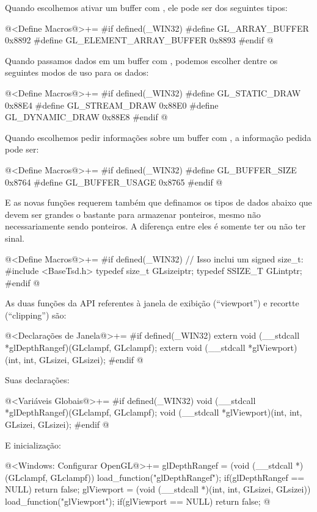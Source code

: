 Quando escolhemos ativar um buffer com , ele
pode ser dos seguintes tipos:

\iniciocodigo
@<Define Macros@>+=
#if defined(_WIN32)
#define GL_ARRAY_BUFFER         0x8892
#define GL_ELEMENT_ARRAY_BUFFER 0x8893
#endif
@
\fimcodigo

Quando passamos dados em um buffer com ,
podemos escolher dentre os seguintes modos de uso para os dados:

\iniciocodigo
@<Define Macros@>+=
#if defined(_WIN32)
#define GL_STATIC_DRAW  0x88E4
#define GL_STREAM_DRAW  0x88E0
#define GL_DYNAMIC_DRAW 0x88E8
#endif
@
\fimcodigo

Quando escolhemos pedir informações sobre um buffer
com , a informação pedida pode ser:

\iniciocodigo
@<Define Macros@>+=
#if defined(_WIN32)
#define GL_BUFFER_SIZE  0x8764
#define GL_BUFFER_USAGE 0x8765
#endif
@
\fimcodigo

E as novas funções requerem também que definamos os tipos de dados
abaixo que devem ser grandes o bastante para armazenar ponteiros,
mesmo não necessariamente sendo ponteiros. A diferença entre eles é
somente ter ou não ter sinal.

\iniciocodigo
@<Define Macros@>+=
#if defined(_WIN32)
// Isso inclui um signed size_t:
#include <BaseTsd.h>
typedef size_t GLsizeiptr;
typedef SSIZE_T GLintptr;
#endif
@
\fimcodigo

As duas funções da API referentes à janela de exibição (``viewport'')
e recortte (``clipping'') são:

\iniciocodigo
@<Declarações de Janela@>+=
#if defined(_WIN32)
extern void (__stdcall *glDepthRangef)(GLclampf, GLclampf);
extern void (__stdcall *glViewport)(int, int, GLsizei, GLsizei);
#endif
@
\fimcodigo

Suas declarações:

\iniciocodigo
@<Variáveis Globais@>+=
#if defined(_WIN32)
void (__stdcall *glDepthRangef)(GLclampf, GLclampf);
void (__stdcall *glViewport)(int, int, GLsizei, GLsizei);
#endif
@
\fimcodigo

E inicialização:

\iniciocodigo
@<Windows: Configurar OpenGL@>+=
glDepthRangef = (void (__stdcall *)(GLclampf, GLclampf))
                   load_function("glDepthRangef");
if(glDepthRangef == NULL) return false;
glViewport = (void (__stdcall *)(int, int, GLsizei, GLsizei))
                load_function("glViewport");
if(glViewport == NULL) return false;
@
\fimcodigo

